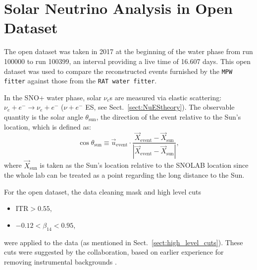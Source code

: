 \section{Solar Neutrino Analysis in Open Dataset}

The open dataset was taken in 2017 at the beginning of the water phase from run 100000 to run 100399, an interval providing a live time of 16.607 days.
This open dataset was used to compare the reconstructed events furnished by the \texttt{MPW fitter} against those from the \texttt{RAT water fitter}.

In the SNO+ water phase, solar $\nu_e$s are measured via elastic scattering: $\nu_e+e^-\to \nu_e+e^-$ ($\nu+e^-$ ES, see Sect.~\ref{sect:NuEStheory}). The observable quantity is the solar angle $\theta_\mathrm{sun}$, the direction of the event relative to the Sun's location, which is defined as:
\begin{equation}
\cos\theta_\mathrm{sun}\equiv \vec u_\mathrm{event}\cdot \frac{\vec{X}_\mathrm{event}-\vec{X}_\mathrm{sun}}{|\vec{X}_\mathrm{event}-\vec{X}_\mathrm{sun}|},
\end{equation}
where $\vec{X}_\mathrm{sun}$ is taken as the Sun's location relative to the SNOLAB location since the whole lab can be treated as a point regarding the long distance to the Sun. 

For the open dataset, the data cleaning mask and high level cuts
\begin{itemize}
    \item $\mathrm{ITR}>0.55$\;,
    \item $-0.12<\beta_{14}<0.95$\;,
\end{itemize}
were applied to the data (as mentioned in Sect.~\ref{sect:high_level_cuts}). These cuts were suggested by the collaboration, based on earlier experience for removing instrumental backgrounds \cite{waterunidoc}. 


